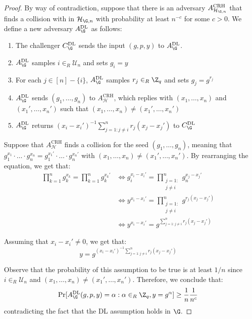 \documentclass[a4paper, 12pt]{report}
\begin{document}
    \begin{proof}
        By way of contradiction, suppose that there is an adversary $A^{\text{CRH}}_{\mathcal{H}_{\G,n}}$ that finds a collision with in $\mathcal{H}_{\G,n}$ with probability at least $n^{-c}$ for some $c > 0$. We define a new adversary $A^{\text{DL}}_{\G}$ as follows:
        \begin{enumerate}
            \item The challenger $C^{\text{DL}}_{\G}$ sends the input $(g,p,y)$ to $A^{\text{DL}}_{\G}$.
            \item $A^{\text{DL}}_{\G}$ samples $i \in_R \mathcal{U}_n$ and sets $g_i = y$
            \item For each $j \in [n] - \{i\}$, $A^{\text{DL}}_{\G}$ samples $r_j \in_R \Z_q$ and sets $g_j = g^{r_j}$
            \item $A^{\text{DL}}_{\G}$ sends $(g_1, \ldots, g_n)$ to $A_{\mathcal{H}}^{\text{CRH}}$, which replies with $(x_1, \ldots, x_n)$ and $(x_1',\ldots, x_n')$ such that $(x_1, \ldots, x_n) \neq (x_1',\ldots, x_n')$
            \item $A^{\text{DL}}_{\G}$ returns $(x_i-x_i')^{-1} \sum_{j = 1 : j \neq i}^n r_j (x_j-x_j')$ to $C^{\text{DL}}_{\G}$
        \end{enumerate}

        Suppose that $A_{\mathcal{H}}^{\text{CRH}}$ finds a collision for the seed $(g_1, \ldots, g_n)$, meaning that $g_1^{x_1} \cdot \ldots \cdot g_n^{x_n} = g_1^{x_1'} \cdot \ldots \cdot g_n^{x_n'}$ with $(x_1, \ldots, x_n) \neq (x_1',\ldots, x_n')$. By rearranging the equation, we get that:
        \[\begin{split}
            \prod_{k = 1}^n g_k^{x_k} = \prod_{k = 1}^n g_k^{x_k'} &\iff g_i^{x_i-x_i'} = \prod_{\substack{j = 1 :\\j \neq i}}^n g_n^{x_j-x_j'} \\
            &\iff y^{x_i-x_i'} = \prod_{\substack{j = 1 :\\j \neq i}}^n g^{r_j(x_j-x_j')} \\
            &\iff y^{x_i-x_i'} = g^{\sum_{j = 1 : j \neq i}^n r_j(x_j-x_j')}
        \end{split}\]
        
        Assuming that $x_i - x_i' \neq 0$, we get that:
        \[y = g^{(x_i-x_i')^{-1} \sum_{j = 1 : j \neq i}^n r_j(x_j-x_j')}\]
        
        Observe that the probability of this assumption to be true is at least $1/n$ since $i \in_R \mathcal{U}_n$ and $(x_1, \ldots, x_n) \neq (x_1', \ldots, x_n')$. Therefore, we conclude that:
        \[\Pr[A^{\text{DL}}_{\G}(g,p,y) = \alpha : \alpha \in_R \Z_q, y = g^\alpha] \geq \frac{1}{n} \frac{1}{n^{c}}\]
        contradicting the fact that the DL assumption holds in $\G$.
    \end{proof}
\end{document}
